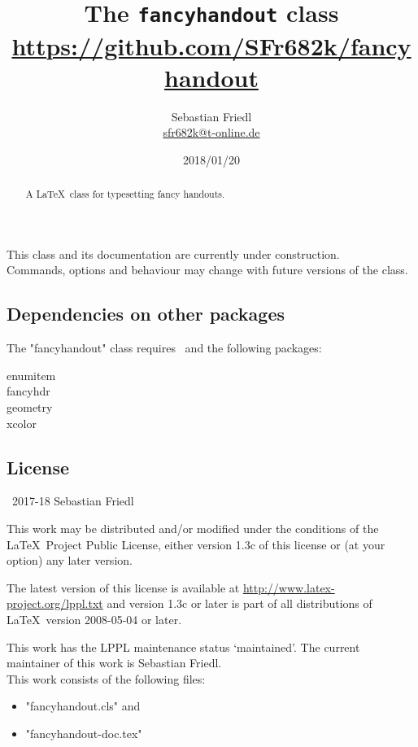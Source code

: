 \documentclass[11pt]{ltxdoc}
\title{The \texttt{fancyhandout} class \\ {\large\url{https://github.com/SFr682k/fancyhandout}}}
\author{Sebastian Friedl \\ \href{mailto:sfr682k@t-online.de}{\ttfamily sfr682k@t-online.de}}
\date{2018/01/20}
\begin{document}
	\maketitle
	
	\begin{abstract}
		\noindent%
		A \LaTeX\ class for typesetting fancy handouts.
	\end{abstract}
	
	This class and its documentation are currently under construction. \\
	Commands, options and behaviour may change with future versions of the class.
	
	\tableofcontents
	\clearpage
	
	
	
	\subsection*{Dependencies on other packages}
	The "fancyhandout" class requires \LaTeXe\ and the following packages:
	\begin{multicols}{3}\ttfamily\centering
		enumitem \\ fancyhdr \\ geometry \\ xcolor
	\end{multicols}
	
	\subsection*{License}
	\textcopyright\ 2017-18 Sebastian Friedl
	
	\smallskip
	This work may be distributed and/or modified under the conditions of the \LaTeX\ Project Public License, either version 1.3c of this license or (at your option) any later version.
	
	\smallskip
	The latest version of this license is available at \url{http://www.latex-project.org/lppl.txt} and version 1.3c or later is part of all distributions of \LaTeX\ version 2008-05-04 or later.
	
	\smallskip
	This work has the LPPL maintenance status \enquote*{maintained}. The current maintainer of this work is Sebastian Friedl. \\
	This work consists of the following files:
	\begin{itemize} \itemsep 0pt
		\item "fancyhandout.cls" and
		\item "fancyhandout-doc.tex"
	\end{itemize}
\end{document}

